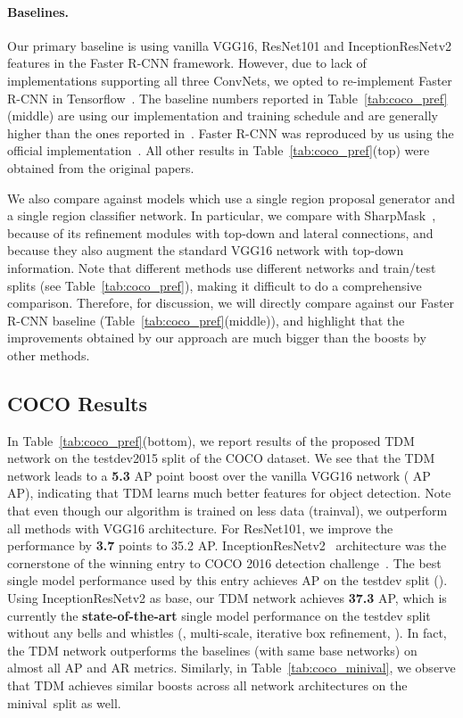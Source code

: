 \documentclass[10pt,twocolumn,letterpaper]{article}
\newcommand{\trainval}{trainval\raisebox{0.2ex}{}}
\newcommand{\minival}{minival\raisebox{0.2ex}{}}
\begin{document}
\vspace{-0.1in}
\paragraph{Baselines.} Our primary baseline is using vanilla VGG16, ResNet101 and InceptionResNetv2 features in the Faster R-CNN framework. However, due to lack of implementations supporting all three ConvNets, we opted to re-implement Faster R-CNN in Tensorflow~\cite{abadi2016tensorflow}. The baseline numbers reported in Table~\ref{tab:coco_pref}(middle) are using our implementation and training schedule and are generally higher than the ones reported in~\cite{ren2015faster,shrivastava2016contextual}. Faster R-CNN\raisebox{0.2ex}{} was reproduced by us using the official implementation~\cite{ren2015faster}. All other results in  Table~\ref{tab:coco_pref}(top) were obtained from the original papers. 

We also compare against models which use a single region proposal generator and a single region classifier network. In particular, we compare with SharpMask~\cite{pinheiro2016learning}, because of its refinement modules with top-down and lateral connections, and~\cite{shrivastava2016contextual} because they also augment the standard VGG16 network with top-down information. Note that different methods use different networks and train/test splits (see Table~\ref{tab:coco_pref}), making it difficult to do a comprehensive comparison. Therefore, for discussion, we will directly compare against our Faster R-CNN baseline (Table~\ref{tab:coco_pref}(middle)), and highlight that the improvements obtained by our approach are much bigger than the boosts by other methods.
\subsection{COCO Results}
In Table~\ref{tab:coco_pref}(bottom), we report results of the proposed TDM network on the testdev2015 split of the COCO dataset. We see that the TDM network leads to a \textbf{5.3} AP point boost over the vanilla VGG16 network ( AP \vs  AP), indicating that TDM learns much better features for object detection. Note that even though our algorithm is trained on less data (\trainval), we outperform all methods with VGG16 architecture. For ResNet101, we improve the performance by  \textbf{3.7} points to 35.2 AP. InceptionResNetv2~\cite{szegedy2016inception} architecture was the cornerstone of the winning entry to COCO 2016 detection challenge~\cite{huang2016speed}. The best single model performance used by this entry achieves  AP on the testdev split (\cite{huang2016speed}). Using InceptionResNetv2 as base, our TDM network achieves \textbf{37.3} AP, which is currently the \textbf{state-of-the-art}  single model performance on the testdev split without any bells and whistles (\eg, multi-scale, iterative box refinement, \etc). In fact, the TDM network outperforms the baselines (with same base networks) on almost all AP and AR metrics. Similarly, in Table~\ref{tab:coco_minival}, we observe that TDM achieves similar boosts across all network architectures on the \minival\ split as well.
\end{document}

